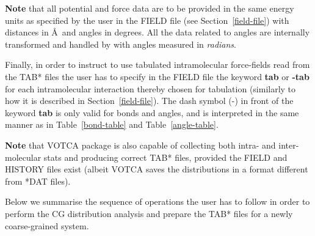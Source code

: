 {\bf Note} that all potential and force data are to be provided 
in the same energy units as specified by the user in the FIELD 
file (see Section~\ref{field-file}) with distances in \AA~and 
angles in degrees. All the data related to angles are internally 
transformed and handled by \D with angles measured in {\em radians}.

Finally, in order to instruct \D to use tabulated intramolecular 
force-fields read from the TAB* files the user has to specify 
in the FIELD file the keyword {\bf tab} or {\bf -tab} for each 
intramolecular interaction thereby chosen for tabulation (similarly 
to how it is described in Section~\ref{field-file}). 
The dash symbol (-) in front of the keyword {\bf tab} is only valid 
for bonds and angles, and is interpreted in the same manner as in 
Table~\ref{bond-table} and Table~\ref{angle-table}. 

{\bf Note} that VOTCA package is also capable of collecting both 
intra- and inter-molecular stats and producing correct TAB* files, 
provided the FIELD and HISTORY files exist (albeit VOTCA saves 
the distributions in a format different from *DAT files). 

Below we summarise the sequence of operations the user has to 
follow in order to perform the CG distribution analysis and 
prepare the TAB* files for a newly coarse-grained system.

